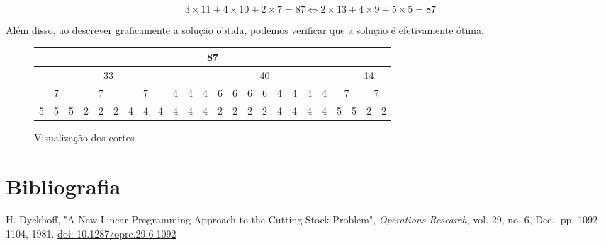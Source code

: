 \documentclass[12pt, a4paper, titlepage]{article}
\begin{document}
$$3 \times 11 + 4 \times 10 + 2 \times 7 = 87 \Leftrightarrow 2 \times 13 + 4 \times 9 + 5 \times 5 = 87$$

Além disso, ao descrever graficamente a solução obtida, podemos verificar que a solução é
efetivamente ótima:

\begin{figure}[H]
    \centering
    \begin{tabular}{|c|c|c|c|c|c|c|c|c|c|c|c|c|c|c|c|c|c|c|c|c|c|c|c|}
        \hline \multicolumn{24}{|c|}{87} \\
        \hline \multicolumn{10}{|c|}{33} & \multicolumn{11}{|c|}{40} & \multicolumn{3}{|c|}{14} \\
        \hline \multicolumn{3}{|c|}{7} & \multicolumn{3}{|c|}{7} & \multicolumn{3}{|c|}{7} & 4 & 4 & 4 & 6 & 6 & 6 & 6 & 4 & 4 & 4 & 4 & \multicolumn{2}{|c|}{7} & \multicolumn{2}{|c|}{7} \\
        \hline 5 & 5 & 5 & 2 & 2 & 2 & 4 & 4 & 4 & 4 & 4 & 4 & 2 & 2 & 2 & 2 & 4 & 4 & 4 & 4 & 5 & 5 & 2 & 2 \\
        \hline
    \end{tabular}
    \caption{Visualização dos cortes}
    \label{fig:cuts}
\end{figure}

\section{Bibliografia}
\def\refname{}
\vspace{-1.5cm}
\begin{thebibliography}{9}
    H. Dyckhoff, "A New Linear Programming Approach to the Cutting Stock Problem",
    \emph{Operations Research}, vol. 29, no. 6, Dec., pp. 1092-1104, 1981.
    \href{https://doi.org/10.1287/opre.29.6.1092}{doi: 10.1287/opre.29.6.1092}
\end{thebibliography}
\end{document}
